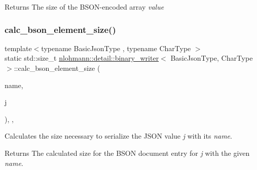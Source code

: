 \begin{DoxyReturn}{Returns}
The size of the B\+S\+O\+N-\/encoded array {\itshape value} 
\end{DoxyReturn}
\mbox{\label{classnlohmann_1_1detail_1_1binary__writer_a1e4372c5984184eb5bcc09af1fcc2ee0}} 
\subsubsection{\texorpdfstring{calc\+\_\+bson\+\_\+element\+\_\+size()}{calc\_bson\_element\_size()}}
{\footnotesize\ttfamily template$<$typename Basic\+Json\+Type , typename Char\+Type $>$ \\
static std\+::size\+\_\+t \hyperlink{classnlohmann_1_1detail_1_1binary__writer}{nlohmann\+::detail\+::binary\+\_\+writer}$<$ Basic\+Json\+Type, Char\+Type $>$\+::calc\+\_\+bson\+\_\+element\+\_\+size (\begin{DoxyParamCaption}\item[{const \hyperlink{classnlohmann_1_1detail_1_1binary__writer_a29f2ae7a5c4a8c1dae47b3b2310de8a8}{string\+\_\+t} \&}]{name,  }\item[{const Basic\+Json\+Type \&}]{j }\end{DoxyParamCaption})\hspace{0.3cm}{\ttfamily [inline]}, {\ttfamily [static]}, {\ttfamily [private]}}



Calculates the size necessary to serialize the J\+S\+ON value {\itshape j} with its {\itshape name}. 

\begin{DoxyReturn}{Returns}
The calculated size for the B\+S\+ON document entry for {\itshape j} with the given {\itshape name}. 
\end{DoxyReturn}
\mbox{\label{classnlohmann_1_1detail_1_1binary__writer_a5bae2f1db2c511b869dffaddf15a1653}} 
